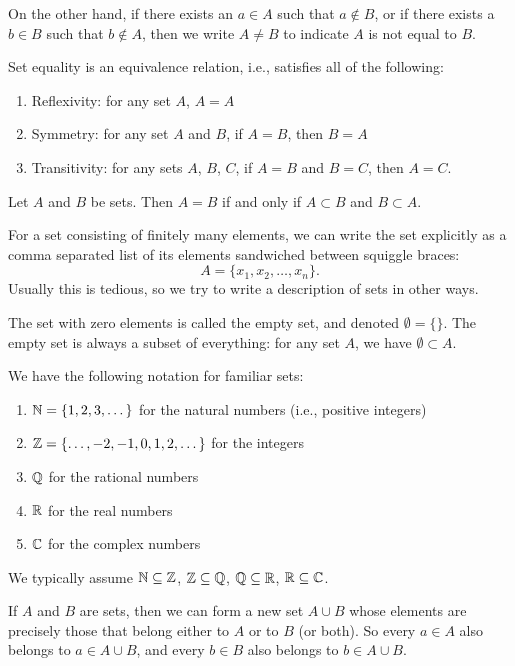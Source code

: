 On the other hand, if there exists an $a\in A$ such that $a\notin B$,
or if there exists a $b\in B$ such that $b\notin A$, then we write
$A\neq B$ to indicate $A$ is not equal to $B$.

\begin{theorem}
Set equality is an equivalence relation, i.e., satisfies all of the
following:
\begin{enumerate}
\item Reflexivity: for any set $A$, $A=A$
\item Symmetry: for any set $A$ and $B$, if $A=B$, then $B=A$
\item Transitivity: for any sets $A$, $B$, $C$, if $A=B$ and $B=C$, then $A=C$.
\end{enumerate}
\end{theorem}

\begin{theorem}
Let $A$ and $B$ be sets.
Then $A=B$ if and only if $A\subset B$ and $B\subset A$.
\end{theorem}

\M
For a set consisting of finitely many elements, we can write the set
explicitly as a comma separated list of its elements sandwiched between
squiggle braces:
\begin{equation}
A = \{x_{1}, x_{2}, \dots, x_{n}\}.
\end{equation}
Usually this is tedious, so we try to write a description of sets in
other ways.

The set with zero elements is called the empty set, and denoted $\emptyset=\{\}$.
The empty set is always a subset of everything: for any set $A$, we have
$\emptyset\subset A$.

We have the following notation for familiar sets:
\begin{enumerate}
\item $\mathbb{N}=\{1,2,3,\dots\}$ for the natural numbers (i.e., positive integers)
\item $\mathbb{Z}=\{\dots,-2,-1,0,1,2,\dots\}$ for the integers
\item $\mathbb{Q}$ for the rational numbers
\item $\mathbb{R}$ for the real numbers
\item $\mathbb{C}$ for the complex numbers
\end{enumerate}
We typically assume $\mathbb{N}\subseteq\mathbb{Z}$, $\mathbb{Z}\subseteq\mathbb{Q}$, $\mathbb{Q}\subseteq\mathbb{R}$,
$\mathbb{R}\subseteq\mathbb{C}$.

If $A$ and $B$ are sets, then we can form a new set $A\cup B$ whose
elements are precisely those that belong either to $A$ or to $B$ (or both).
So every $a\in A$ also belongs to $a\in A\cup B$,
and every $b\in B$ also belongs to $b\in A\cup B$.

